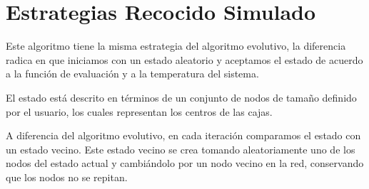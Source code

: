\section{Estrategias Recocido Simulado}
\label{cap4:recocido}
Este algoritmo tiene la misma estrategia del algoritmo evolutivo, la diferencia radica en que iniciamos con un estado aleatorio y aceptamos el estado de acuerdo a la función de evaluación y a la temperatura del sistema.

El estado está descrito en términos de un conjunto de nodos de tamaño definido por el usuario, los cuales representan los centros de las cajas.

A diferencia del algoritmo evolutivo, en cada iteración comparamos el estado con un estado vecino. Este estado vecino se crea tomando aleatoriamente uno de los nodos del estado actual y cambiándolo por un nodo vecino en la red, conservando que los nodos no se repitan.